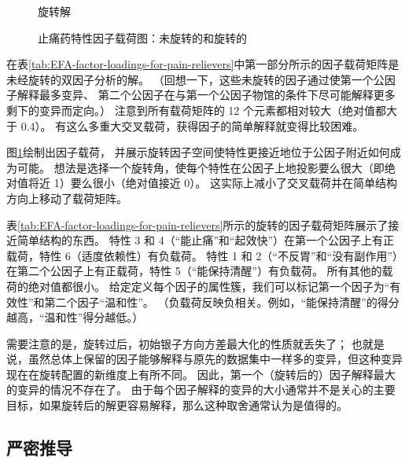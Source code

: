 \begin{figure}
\begin{floatrow}
{\begin{subfloatrow}
{
                }{\caption{旋转解}}   
            \end{subfloatrow}
        }{
            \caption{止痛药特性因子载荷图：未旋转的和旋转的}
            \label{fig:EFA-plot-of-factor-loadings-for-attributes-of-pain-relievers}
        }
    \end{floatrow}
\end{figure}

在表\ref{tab:EFA-factor-loadings-for-pain-relievers}中第一部分所示的因子载荷矩阵是未经旋转的双因子分析的解。
（回想一下，这些未旋转的因子通过使第一个公因子解释最多变异、
第二个公因子在与第一个公因子物馆的条件下尽可能解释更多剩下的变异而定向。）
注意到所有载荷矩阵的 12 个元素都相对较大（绝对值都大于 0.4）。
有这么多重大交叉载荷，获得因子的简单解释就变得比较困难。

图\ref{fig:EFA-plot-of-factor-loadings-for-attributes-of-pain-relievers}绘制出因子载荷，
并展示旋转因子空间使特性更接近地位于公因子附近如何成为可能。
想法是选择一个旋转角，使每个特性在公因子上地投影要么很大（即绝对值将近 1）要么很小（绝对值接近 0）。
这实际上减小了交叉载荷并在简单结构方向上移动了载荷矩阵。

表\ref{tab:EFA-factor-loadings-for-pain-relievers}所示的旋转的因子载荷矩阵展示了接近简单结构的东西。
特性 3 和 4（“能止痛”和“起效快”）在第一个公因子上有正载荷，特性 6（适度依赖性）有负载荷。
特性 1 和 2（“不反胃”和“没有副作用”）在第二个公因子上有正载荷，特性 5（“能保持清醒”）有负载荷。
所有其他的载荷的绝对值都很小。
给定定义每个因子的属性簇，我们可以标记第一个因子为“有效性”和第二个因子“温和性”。
（负载荷反映负相关。例如，“能保持清醒”的得分越高，“温和性”得分越低。）

需要注意的是，旋转过后，初始银子方向方差最大化的性质就丢失了；
也就是说，虽然总体上保留的因子能够解释与原先的数据集中一样多的变异，但这种变异现在在旋转配置的新维度上有所不同。
因此，第一个（旋转后的）因子解释最大的变异的情况不存在了。
由于每个因子解释的变异的大小通常并不是关心的主要目标，如果旋转后的解更容易解释，那么这种取舍通常认为是值得的。

\subsection{严密推导}\label{sec:EFA-Mechanics}